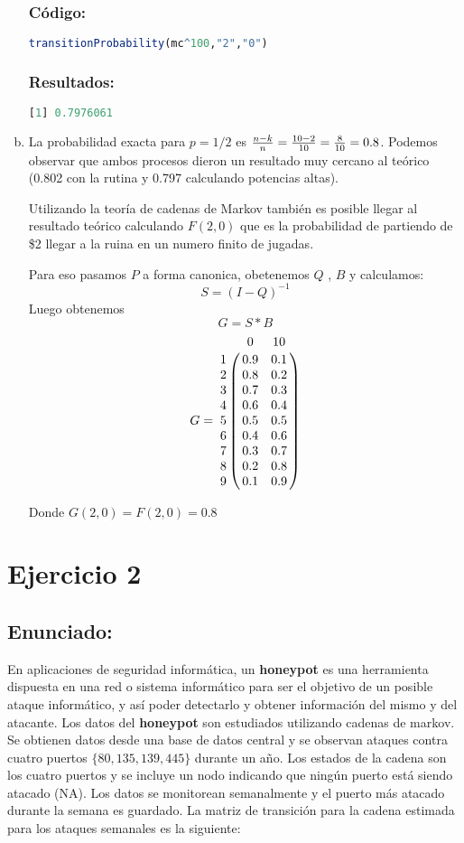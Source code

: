 \documentclass{article}
\begin{document}
\begin{enumerate}[(a)]
\subsubsection*{Código:}
\begin{lstlisting}[language=R]
transitionProbability(mc^100,"2","0")
\end{lstlisting}

\subsubsection*{Resultados:}
\begin{lstlisting}[language=R]
[1] 0.7976061
\end{lstlisting}
\item La probabilidad exacta para $p = 1/2$ es ${n-k\over n} = {10-2\over 10} =  {8\over 10} = 0.8 $. Podemos observar que ambos procesos dieron un resultado muy cercano al teórico (0.802 con la rutina y 0.797 calculando potencias altas).

Utilizando la teoría de cadenas de Markov también es posible llegar al resultado teórico calculando $F(2,0)$ que es la probabilidad de partiendo de \$2 llegar a la ruina en un numero finito de jugadas.

Para eso pasamos $P$ a forma canonica, obetenemos $Q$ , $B$ y calculamos: $$S = (I - Q)^{-1}$$ Luego obtenemos $$ G = S*B$$ 
$$
G = 
\bordermatrix{ 
\text{} & 0 & 10 \cr
 1  &0.9  &0.1 \cr
 2  &0.8  &0.2 \cr
 3  &0.7  &0.3 \cr
 4  &0.6  &0.4 \cr
 5  &0.5  &0.5 \cr
 6  &0.4  &0.6 \cr
 7  &0.3  &0.7 \cr
 8 & 0.2  &0.8 \cr
 9&  0.1  &0.9
}
$$

Donde $G(2,0) = F(2,0) = 0.8$

\end{enumerate}





\section*{Ejercicio 2}
\subsection*{Enunciado:}
En aplicaciones de seguridad informática, un \textbf{honeypot} es una herramienta dispuesta en una red o sistema informático para ser el objetivo de un posible ataque informático, y así poder detectarlo y obtener información del mismo y del atacante. Los datos del \textbf{honeypot} son estudiados utilizando cadenas de markov. Se obtienen datos desde una base de datos central y se observan ataques contra cuatro puertos $\{80,135, 139, 445\}$ durante un año. Los estados de la cadena son los cuatro puertos y se incluye un nodo indicando que ningún puerto está siendo atacado (NA). Los datos se monitorean semanalmente y el puerto más atacado durante la semana es guardado. La matriz de transición para la cadena estimada para los ataques semanales es la siguiente:
\end{document}
